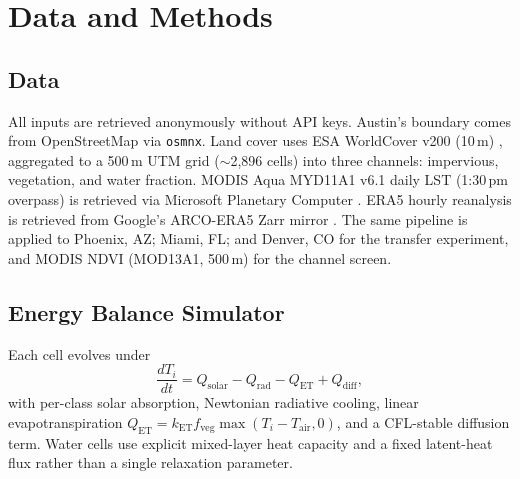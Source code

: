 \documentclass[conference]{IEEEtran}
\begin{document}
\section{Data and Methods}

\subsection{Data}
All inputs are retrieved anonymously without API keys. Austin's boundary
comes from OpenStreetMap via \texttt{osmnx}. Land cover uses ESA
WorldCover v200 (10\,m) \cite{zanaga2022esa}, aggregated to a 500\,m UTM
grid ($\sim$2{,}896 cells) into three channels: impervious, vegetation,
and water fraction. MODIS Aqua MYD11A1 v6.1 daily LST (1:30\,pm overpass)
is retrieved via Microsoft Planetary Computer \cite{microsoft_pc}. ERA5
hourly reanalysis is retrieved from Google's ARCO-ERA5 Zarr mirror
\cite{hersbach2020era5}. The same pipeline is applied to Phoenix, AZ;
Miami, FL; and Denver, CO for the transfer experiment, and MODIS NDVI
(MOD13A1, 500\,m) for the channel screen.

\subsection{Energy Balance Simulator}
Each cell evolves under
\begin{equation}
  \frac{dT_i}{dt} = Q_{\mathrm{solar}} - Q_{\mathrm{rad}}
                  - Q_{\mathrm{ET}} + Q_{\mathrm{diff}},
  \label{eq:slab}
\end{equation}
with per-class solar absorption, Newtonian radiative cooling, linear
evapotranspiration $Q_{\mathrm{ET}} = k_{\mathrm{ET}} f_{\mathrm{veg}}
\max(T_i - T_{\mathrm{air}}, 0)$, and a CFL-stable diffusion term. Water
cells use explicit mixed-layer heat capacity and a fixed latent-heat flux
rather than a single relaxation parameter.
\end{document}
